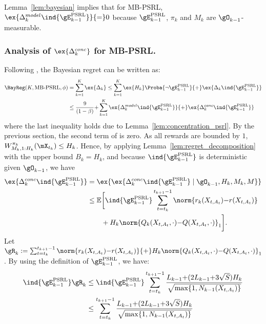 Lemma~\ref{lem:bayesian} implies that for MB-PSRL, $\ex{\Delta^{model}_k \ind{\gE_{k-1}^\text{PSRL}}}{=}0$ because
$\gE_{k-1}^\text{PSRL}$, $\pi_k$ and $M_k$ are $\gO_{k-1}$-measurable. 

\subsubsection{Analysis of $\ex{\Delta^{conc}_k}$ for MB-PSRL.}
Following , the Bayesian regret can be written as:
\begin{align}
    \BayReg(K,\text{MB-PSRL},\phi)
    &= \sum_{k=1}^K \ex{\Delta_k} \le \sum_{k=1}^{K}\ex{H_k}\Proba{\neg \gE^\text{PSRL}_{k-1}} {+}\ex{\Delta_k \ind{\gE^\text{PSRL}_{k-1}}} \nonumber \\
    &\le \frac{9}{(1-\beta)} {+} \sum_{k=1}^{K} \ex{\Delta^{model}_k\ind{\gE^\text{PSRL}_{k-1}}} {+} \ex{\Delta^{conc}_k\ind{\gE^\text{PSRL}_{k-1}}}
    \label{eq:proof_PSRL_regret}
\end{align}
where the last inequality holds due to Lemma~\ref{lem:concentration_psrl}.
By the previous section, the second term of  is zero.
As all rewards are bounded by $1$, $W_{M_k,1:H_k}^{\pi_k}(\mX_{t_k})\le H_k$. Hence, by applying Lemma~\ref{lem:regret_decomposition} with the upper bound $B_k=H_k$, and because $\ind{\gE_{k-1}^\text{PSRL}}$ is deterministic given $\gO_{k-1}$, we have
\begin{align}
    \ex{\Delta_k^{conc} \ind{\gE_{k-1}^\text{PSRL}}}
    &= \ex{\ex{\Delta_k^{conc} \ind{\gE_{k-1}^\text{PSRL}} \mid \gO_{k-1}, H_k, M_k, M}} \nonumber \\
    &\le \mathbb{E}\bigg[ \ind{\gE_{k-1}^\text{PSRL}} \sum_{t=t_k}^{t_{k+1}-1}\norm{r_k(X_{t,A_t}){-}r(X_{t,A_t})} \nonumber\\
    &\qquad +H_k\norm{Q_{k}(X_{t,A_t},\cdot){-}Q(X_{t,A_t},\cdot)}_1 \bigg]. \label{eq:conc_with_i}
\end{align}
Let $\gR_k := \sum_{t=t_k}^{t_{k+1}-1}\norm{r_k(X_{t,A_t}){-}r(X_{t,A_t})} {+}H_k\norm{Q_{k}(X_{t,A_t},\cdot){-}Q(X_{t,A_t},\cdot)}_1$. 
By using the definition of $\gE_{k-1}^\text{PSRL}$, we have:
\begin{align}
    \ind{\gE_{k-1}^\text{PSRL}}\gR_k 
    &\le \ind{\gE_{k-1}^\text{PSRL}} \sum_{t=t_k}^{t_{k+1}-1} \frac{L_{k-1}{+}(2L_{k-1} {+}3\sqrt{S})H_k}{\sqrt{\max\{1,N_{k-1}(X_{t,A_t})\} }} \nonumber\\
    &\le \sum_{t=t_k}^{t_{k+1}-1} \frac{L_{k-1}{+}(2L_{k-1} {+}3\sqrt{S})H_k}{\sqrt{\max\{1,N_{k-1}(X_{t,A_t})\} }} \label{eq:PSRL_R_k}
\end{align}

